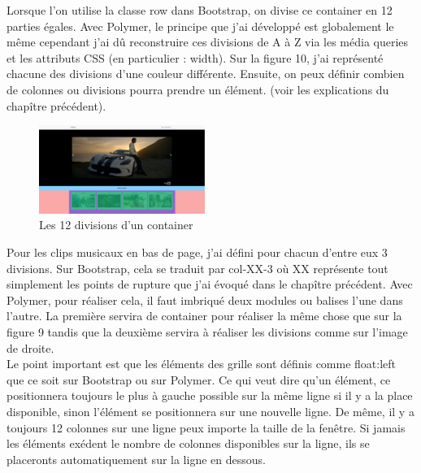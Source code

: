 \documentclass{article}
\begin{document}
Lorsque l'on utilise la classe \og row \fg{} dans Bootstrap, on divise ce container en 12 parties \'egales. Avec Polymer, le principe que j'ai d\'evelopp\'e est globalement le m\^eme cependant j'ai d\^u reconstruire ces divisions de A \`a Z via les m\'edia queries et les attributs CSS (en particulier : width). Sur la figure 10, j'ai repr\'esent\'e chacune des divisions d'une couleur diff\'erente. Ensuite, on peux d\'efinir combien de colonnes ou divisions pourra prendre un \'el\'ement. (voir les explications du chap\^itre pr\'ec\'edent).\\

\newpage
\begin{figure}
  \vspace{-25pt}
  \begin{center}
    \includegraphics[width=0.48\textwidth]{p11}
  \end{center}
  \vspace{-20pt}
  \caption{Les 12 divisions d'un container}
  \vspace{-10pt}
\end{figure} 

Pour les clips musicaux en bas de page, j'ai d\'efini pour chacun d'entre eux 3 divisions. Sur Bootstrap, cela se traduit par \og col-XX-3 \fg{} o\`u XX repr\'esente tout simplement les points de rupture que j'ai \'evoqu\'e dans le chap\^itre pr\'ec\'edent. Avec Polymer, pour r\'ealiser cela, il faut imbriqu\'e deux modules ou balises l'une dans l'autre. La premi\`ere servira de container pour r\'ealiser la m\^eme chose que sur la figure 9 tandis que la deuxi\`eme servira \`a r\'ealiser les divisions comme sur l'image de droite.\\

Le point important est que les \'el\'ements des grille sont d\'efinis comme \og float:left \fg{} que ce soit sur Bootstrap ou sur Polymer. Ce qui veut dire qu'un \'el\'ement, ce positionnera toujours le plus \`a gauche possible sur la m\^eme ligne si il y a la place disponible, sinon l'\'el\'ement se positionnera sur une nouvelle ligne. De m\^eme, il y a toujours 12 colonnes sur une ligne peux importe la taille de la fen\^etre. Si jamais les \'el\'ements ex\'edent le nombre de colonnes disponibles sur la ligne, ils se placeronts automatiquement sur la ligne en dessous.\\
\end{document}
